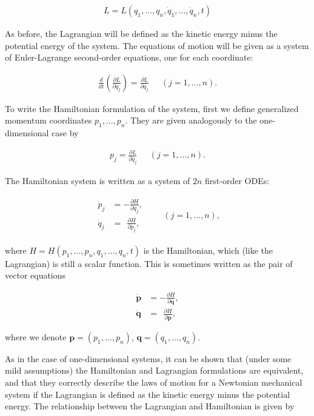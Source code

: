 \documentclass[11pt]{report}
\theoremstyle{plain}
\theoremstyle{definition}
\begin{document}
\begin{align*}
L = L(q_1,\ldots,q_n,\dot{q}_1,\ldots,\dot{q}_n, t)
\end{align*}

As before, the Lagrangian will be defined as the
kinetic energy minus the potential energy of the
system. The equations of motion will be given as a
system of Euler-Lagrange second-order equations, one
for each coordinate:

\begin{align*}
\frac{d}{dt}\left( \frac{\partial L}{\partial \dot{q}_j} \right) = \frac{\partial L}{\partial q_j} \ \ \quad (j=1,\ldots,n).
\end{align*}

To write the Hamiltonian formulation of the system,
first we define generalized momentum coordinates
$p_1,\ldots,p_n$. They are given analogously to the
one-dimensional case by

\begin{align*}
p_j = \frac{\partial L}{\partial \dot{q}_j} \ \ \quad (j=1,\ldots,n).
\end{align*}

The Hamiltonian system is written as a system of $2n$
first-order ODEs:

\begin{align*}
\begin{array}{rl} \displaystyle
\dot{p}_j &= \displaystyle-\frac{\partial H}{\partial q_j}, \\
\displaystyle \dot{q}_j &= \displaystyle \ \ \frac{\partial H}{\partial p_j},
\end{array} \qquad (j=1,\ldots,n),
\end{align*}

where $H=H(p_1,\ldots,p_n,q_1,\ldots,q_n, t)$ is the
Hamiltonian, which (like the Lagrangian) is still a
scalar function. This is sometimes written as the pair
of vector equations

\begin{align*}
\dot{\mathbf{p}} &= -\frac{\partial H}{\partial \mathbf{q}}, \\
\dot{\mathbf{q}} &= \ \ \frac{\partial H}{\partial \mathbf{p}},
\end{align*}

where we denote $\mathbf{p}=(p_1,\ldots,p_n)$,
$\mathbf{q}=(q_1,\ldots,q_n)$.

As in the case of one-dimensional systems, it can be
shown that (under some mild assumptions) the
Hamiltonian and Lagrangian formulations are
equivalent, and that they correctly describe the laws
of motion for a Newtonian mechanical system if the
Lagrangian is defined as the kinetic energy minus the
potential energy. The relationship between the
Lagrangian and Hamiltonian is given by
\end{document}

